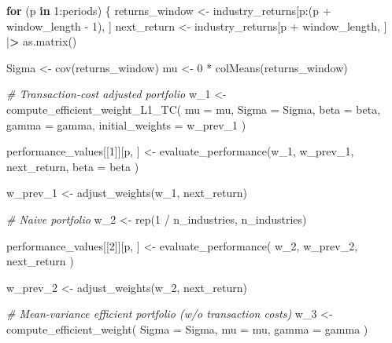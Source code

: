 \documentclass[
]{krantz}
\newenvironment{Shaded}{\begin{snugshade}}{\end{snugshade}}
\newcommand{\AttributeTok}[1]{\textcolor[rgb]{0.61,0.61,0.61}{#1}}
\newcommand{\CommentTok}[1]{\textcolor[rgb]{0.37,0.37,0.37}{\textit{#1}}}
\newcommand{\ControlFlowTok}[1]{\textcolor[rgb]{0.27,0.27,0.27}{\textbf{#1}}}
\newcommand{\DecValTok}[1]{\textcolor[rgb]{0.06,0.06,0.06}{#1}}
\newcommand{\ErrorTok}[1]{\textcolor[rgb]{0.14,0.14,0.14}{\textbf{#1}}}
\newcommand{\FunctionTok}[1]{\textcolor[rgb]{0,0,0}{#1}}
\newcommand{\NormalTok}[1]{#1}
\newcommand{\OtherTok}[1]{\textcolor[rgb]{0.37,0.37,0.37}{#1}}
\newcommand{\SpecialCharTok}[1]{\textcolor[rgb]{0,0,0}{#1}}
\begin{document}
\begin{Shaded}
\begin{Highlighting}[]
\ControlFlowTok{for}\NormalTok{ (p }\ControlFlowTok{in} \DecValTok{1}\SpecialCharTok{:}\NormalTok{periods) \{}
\NormalTok{  returns\_window }\OtherTok{\textless{}{-}}\NormalTok{ industry\_returns[p}\SpecialCharTok{:}\NormalTok{(p }\SpecialCharTok{+}\NormalTok{ window\_length }\SpecialCharTok{{-}} \DecValTok{1}\NormalTok{), ]}
\NormalTok{  next\_return }\OtherTok{\textless{}{-}}\NormalTok{ industry\_returns[p }\SpecialCharTok{+}\NormalTok{ window\_length, ] }\SpecialCharTok{|}\ErrorTok{\textgreater{}} \FunctionTok{as.matrix}\NormalTok{()}

\NormalTok{  Sigma }\OtherTok{\textless{}{-}} \FunctionTok{cov}\NormalTok{(returns\_window)}
\NormalTok{  mu }\OtherTok{\textless{}{-}} \DecValTok{0} \SpecialCharTok{*} \FunctionTok{colMeans}\NormalTok{(returns\_window)}

  \CommentTok{\# Transaction{-}cost adjusted portfolio}
\NormalTok{  w\_1 }\OtherTok{\textless{}{-}} \FunctionTok{compute\_efficient\_weight\_L1\_TC}\NormalTok{(}
    \AttributeTok{mu =}\NormalTok{ mu,}
    \AttributeTok{Sigma =}\NormalTok{ Sigma,}
    \AttributeTok{beta =}\NormalTok{ beta,}
    \AttributeTok{gamma =}\NormalTok{ gamma,}
    \AttributeTok{initial\_weights =}\NormalTok{ w\_prev\_1}
\NormalTok{  )}

\NormalTok{  performance\_values[[}\DecValTok{1}\NormalTok{]][p, ] }\OtherTok{\textless{}{-}} \FunctionTok{evaluate\_performance}\NormalTok{(w\_1,}
\NormalTok{    w\_prev\_1,}
\NormalTok{    next\_return,}
    \AttributeTok{beta =}\NormalTok{ beta}
\NormalTok{  )}

\NormalTok{  w\_prev\_1 }\OtherTok{\textless{}{-}} \FunctionTok{adjust\_weights}\NormalTok{(w\_1, next\_return)}

  \CommentTok{\# Naive portfolio}
\NormalTok{  w\_2 }\OtherTok{\textless{}{-}} \FunctionTok{rep}\NormalTok{(}\DecValTok{1} \SpecialCharTok{/}\NormalTok{ n\_industries, n\_industries)}

\NormalTok{  performance\_values[[}\DecValTok{2}\NormalTok{]][p, ] }\OtherTok{\textless{}{-}} \FunctionTok{evaluate\_performance}\NormalTok{(}
\NormalTok{    w\_2,}
\NormalTok{    w\_prev\_2,}
\NormalTok{    next\_return}
\NormalTok{  )}

\NormalTok{  w\_prev\_2 }\OtherTok{\textless{}{-}} \FunctionTok{adjust\_weights}\NormalTok{(w\_2, next\_return)}

  \CommentTok{\# Mean{-}variance efficient portfolio (w/o transaction costs)}
\NormalTok{  w\_3 }\OtherTok{\textless{}{-}} \FunctionTok{compute\_efficient\_weight}\NormalTok{(}
    \AttributeTok{Sigma =}\NormalTok{ Sigma,}
    \AttributeTok{mu =}\NormalTok{ mu,}
    \AttributeTok{gamma =}\NormalTok{ gamma}
\NormalTok{  )}


\end{Highlighting}
\end{Shaded}
\end{document}
